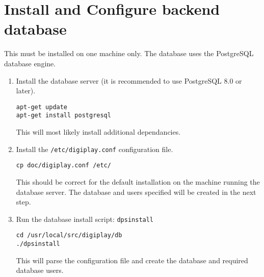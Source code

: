 \documentclass[a4paper,12pt]{report}
\numberwithin{equation}{section}
\begin{document}
\section{Install and Configure backend database}
This must be installed on one machine only. The database uses the PostgreSQL database engine.
\begin{enumerate}
\item Install the database server (it is recommended to use PostgreSQL 8.0 or later).
\begin{lstlisting}
apt-get update
apt-get install postgresql
\end{lstlisting}
This will most likely install additional dependancies.
\item Install the \texttt{/etc/digiplay.conf} configuration file.
\begin{lstlisting}
cp doc/digiplay.conf /etc/
\end{lstlisting}
This should be correct for the default installation on the machine running the database server. The database and users specified will be created in the next step.
\item Run the database install script: \texttt{dpsinstall}
\begin{lstlisting}
cd /usr/local/src/digiplay/db
./dpsinstall
\end{lstlisting}
This will parse the configuration file and create the database and required database users.
\end{enumerate}
\end{document}
